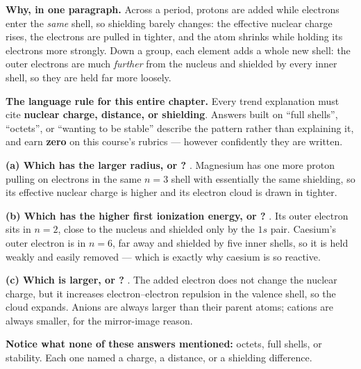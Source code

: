 \documentclass{apchem-worksheet}
\begin{document}
\textbf{Why, in one paragraph.} Across a period, protons are added while
electrons enter the \emph{same} shell, so shielding barely changes: the
effective nuclear charge rises, the electrons are pulled in tighter, and
the atom shrinks while holding its electrons more strongly. Down a
group, each element adds a whole new shell: the outer electrons are much
\emph{further} from the nucleus and shielded by every inner shell, so
they are held far more loosely.

\begin{apctrap}
\textbf{The language rule for this entire chapter.} Every trend
explanation must cite \textbf{nuclear charge, distance, or shielding}.
Answers built on ``full shells'', ``octets'', or ``wanting to be
stable'' describe the pattern rather than explaining it, and earn
\textbf{zero} on this course's rubrics --- however confidently they are
written.
\end{apctrap}

\begin{workedexample}
\textbf{(a) Which has the larger radius,  or ?}
\textbf{}. Magnesium has one more proton pulling on electrons in
the same $n = 3$ shell with essentially the same shielding, so its
effective nuclear charge is higher and its electron cloud is drawn in
tighter.

\textbf{(b) Which has the higher first ionization energy,  or
?} \textbf{}. Its outer electron sits in $n = 2$, close to
the nucleus and shielded only by the $1s$ pair. Caesium's outer electron
is in $n = 6$, far away and shielded by five inner shells, so it is held
weakly and easily removed --- which is exactly why caesium is so
reactive.

\textbf{(c) Which is larger,  or ?} \textbf{}.
The added electron does not change the nuclear charge, but it increases
electron--electron repulsion in the valence shell, so the cloud expands.
Anions are always larger than their parent atoms; cations are always
smaller, for the mirror-image reason.

\textbf{Notice what none of these answers mentioned:} octets, full
shells, or stability. Each one named a charge, a distance, or a
shielding difference.
\end{workedexample}
\end{document}
